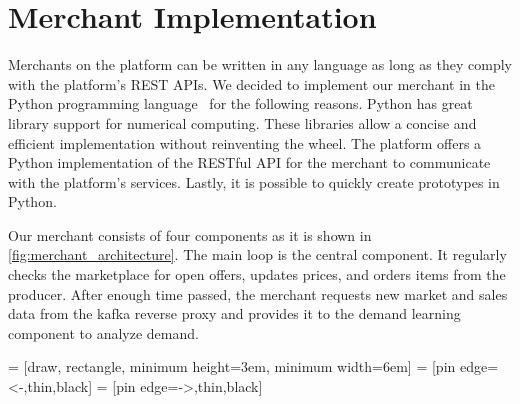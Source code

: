 %

\section{Merchant Implementation}
Merchants on the \pricewars platform can be written in any language as long as they comply with the platform's REST APIs.
We decided to implement our merchant in the Python programming language~\cite{DBLP:conf/usenix/Rossum07} for the following reasons.
Python has great library support for numerical computing.
These libraries allow a concise and efficient implementation without reinventing the wheel.
The \pricewars platform offers a Python implementation of the RESTful API for the merchant to communicate with the platform's services.
Lastly, it is possible to quickly create prototypes in Python.

Our merchant consists of four components as it is shown in \cref{fig:merchant_architecture}.
The main loop is the central component.
It regularly checks the marketplace for open offers, updates prices, and orders items from the producer.
After enough time passed, the merchant requests new market and sales data from the kafka reverse proxy and provides it to the demand learning component to analyze demand.

\bgroup
{} = [draw, rectangle, minimum height=3em, minimum width=6em]
 = [pin edge={<-,thin,black}]
 = [pin edge={->,thin,black}]


\renewcommand{\arraystretch}{0.4}


